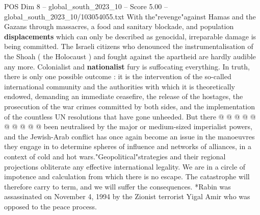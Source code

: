 \begin{textsample}{POS Dim 8 – global\_south\_2023\_10 – Score 5.00 – global\_south\_2023\_10/103054055.txt}
With the"revenge"against Hamas and the Gazans through massacres, a food and sanitary blockade, and population \textbf{displacements} which can only be described as genocidal, irreparable damage is being committed.
The Israeli citizens who denounced the instrumentalisation of the Shoah ( the Holocaust ) and fought against the apartheid are hardly audible any more.
Colonialist and \textbf{nationalist} fury is suffocating everything.
In truth, there is only one possible outcome : it is the intervention of the so-called international community and the authorities with which it is theoretically endowed, demanding an immediate ceasefire, the release of the hostages, the prosecution of the war crimes committed by both sides, and the implementation of the countless UN resolutions that have gone unheeded.
But there @ @ @ @ @ @ @ @ @ @ been neutralised by the major or medium-sized imperialist powers, and the Jewish-Arab conflict has once again become an issue in the manoeuvres they engage in to determine spheres of influence and networks of alliances, in a context of cold and hot wars."Geopolitical"strategies and their regional projections obliterate any effective international legality.
We are in a circle of impotence and calculation from which there is no escape.
The catastrophe will therefore carry to term, and we will suffer the consequences. *Rabin was assassinated on November 4, 1994 by the Zionist terrorist Yigal Amir who was opposed to the peace process.

\end{textsample}
